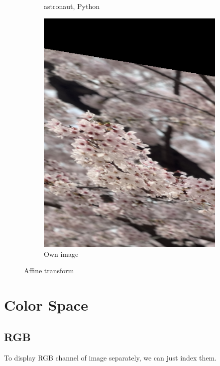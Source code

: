 \documentclass{article}
\begin{document}
\begin{figure}[!ht]
\begin{subfigure}{0.267\textwidth}
        \caption{astronaut, Python}
    \end{subfigure}
    \begin{subfigure}{0.2\textwidth}
        \includegraphics[width=\textwidth]{./fig/affine_cb.png}
        \caption{Own image}
    \end{subfigure}
    \caption{Affine transform}
\end{figure}

\newpage
\section{Color Space}
\subsection{RGB}
To display RGB channel of image separately, we can just index them.
\end{document}
